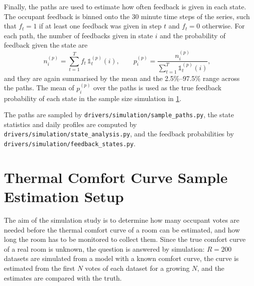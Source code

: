 Finally, the paths are used to estimate how often feedback is given in each
state. The occupant feedback is binned onto the 30 minute time steps of the
series, such that $f_t = 1$ if at least one feedback was given in step $t$ and
$f_t = 0$ otherwise. For each path, the number of feedbacks given in state $i$
and the probability of feedback given the state are
\begin{equation}
    n^{(p)}_i = \sum_{t=1}^{T} f_t\, \mathds{1}^{(p)}_t(i),
    \qquad
    p^{(p)}_i = \frac{n^{(p)}_i}{\sum_{t=1}^{T} \mathds{1}^{(p)}_t(i)},
\end{equation}
and they are again summarised by the mean and the 2.5\%--97.5\% range across the
paths. The mean of $p^{(p)}_i$ over the paths is used as the true feedback
probability of each state in the sample size simulation in
\cref{sec:sample-size-setup}.

The paths are sampled by \texttt{drivers/simulation/sample\_paths.py}, the
state statistics and daily profiles are computed by
\texttt{drivers/simulation/state\_analysis.py}, and the feedback probabilities
by \texttt{drivers/simulation/feedback\_states.py}.

\section{Thermal Comfort Curve Sample Estimation Setup}\label{sec:sample-size-setup}
The aim of the simulation study is to determine how many occupant votes are
needed before the thermal comfort curve of a room can be estimated, and how long
the room has to be monitored to collect them. Since the true comfort curve of a
real room is unknown, the question is answered by simulation: $R = 200$
datasets are simulated from a model with a known comfort curve, the curve is
estimated from the first $N$ votes of each dataset for a growing $N$, and the
estimates are compared with the truth.

